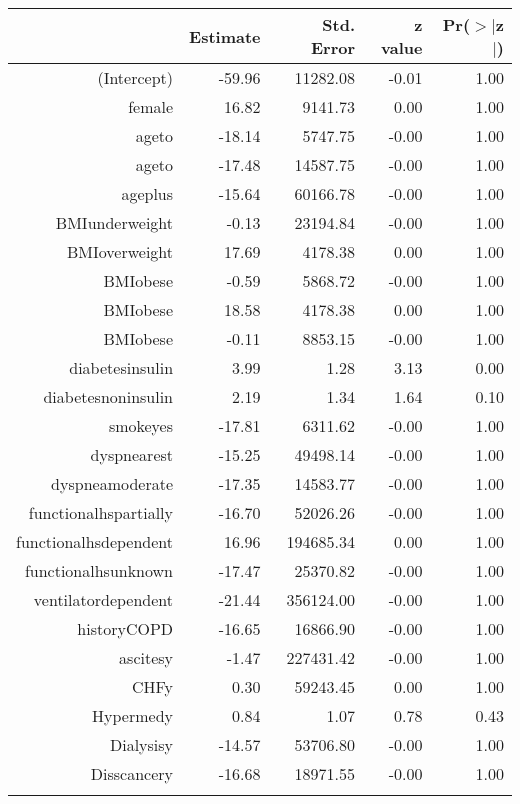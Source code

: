 \bigskip\bigskip
\centering
\begin{tabular}{rrrrr}
  \hline
 & Estimate & Std. Error & z value & Pr($>$$|$z$|$) \\ 
  \hline
(Intercept) & -59.96 & 11282.08 & -0.01 & 1.00 \\ 
  female & 16.82 & 9141.73 & 0.00 & 1.00 \\ 
  age\-65\-to\-74 & -18.14 & 5747.75 & -0.00 & 1.00 \\ 
  age\-75\-to\-84 & -17.48 & 14587.75 & -0.00 & 1.00 \\ 
  age\-85\-plus & -15.64 & 60166.78 & -0.00 & 1.00 \\ 
  BMI\-underweight & -0.13 & 23194.84 & -0.00 & 1.00 \\ 
  BMI\-overweight & 17.69 & 4178.38 & 0.00 & 1.00 \\ 
  BMI\-obese\-1 & -0.59 & 5868.72 & -0.00 & 1.00 \\ 
  BMI\-obese\-2 & 18.58 & 4178.38 & 0.00 & 1.00 \\ 
  BMI\-obese\-3 & -0.11 & 8853.15 & -0.00 & 1.00 \\ 
  diabetes\-insulin & 3.99 & 1.28 & 3.13 & 0.00 \\ 
  diabetes\-noninsulin & 2.19 & 1.34 & 1.64 & 0.10 \\ 
  smoke\-yes & -17.81 & 6311.62 & -0.00 & 1.00 \\ 
  dyspnea\-rest & -15.25 & 49498.14 & -0.00 & 1.00 \\ 
  dyspnea\-moderate & -17.35 & 14583.77 & -0.00 & 1.00 \\ 
  functional\-hs\-partially & -16.70 & 52026.26 & -0.00 & 1.00 \\ 
  functional\-hs\-dependent & 16.96 & 194685.34 & 0.00 & 1.00 \\ 
  functional\-hs\-unknown & -17.47 & 25370.82 & -0.00 & 1.00 \\ 
  ventilator\-dependent & -21.44 & 356124.00 & -0.00 & 1.00 \\ 
  history\-COPD & -16.65 & 16866.90 & -0.00 & 1.00 \\ 
  ascites\-y & -1.47 & 227431.42 & -0.00 & 1.00 \\ 
  CHF\-y & 0.30 & 59243.45 & 0.00 & 1.00 \\ 
  Hyper\-med\-y & 0.84 & 1.07 & 0.78 & 0.43 \\ 
  Dialysis\-y & -14.57 & 53706.80 & -0.00 & 1.00 \\ 
  Diss\-cancer\-y & -16.68 & 18971.55 & -0.00 & 1.00 \\ 
$$
\end{tabular}
